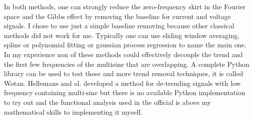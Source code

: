 In both methods, one can strongly reduce the zero-frequency skirt in the Fourier space and the Gibbs effect  by removing the baseline for current and voltage signals. I chose to use just a simple baseline removing because other classical methods did not work for me. Typically one can use sliding window averaging, spline or polynomial fitting or gaussian process regression to name the main one. In my experience non of these methods could effectively decouple the trend and the first few frequencies of the multisine that are overlapping. A complete Python library can be used to test these and more trend removal techniques, it is called Wotan. Hellemans and al. developed a method for de-trending signals with low frequency containing multi-sine but there is no available Python implementation to try out and the functional analysis used in the official is above my mathematical skills to implementing it myself.




















